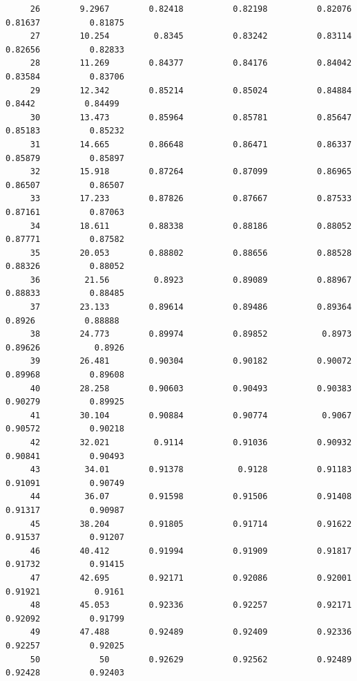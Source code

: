 \documentclass[
]{book}
\begin{document}
\begin{verbatim}
     26        9.2967        0.82418          0.82198          0.82076          0.81637          0.81875   
     27        10.254         0.8345          0.83242          0.83114          0.82656          0.82833   
     28        11.269        0.84377          0.84176          0.84042          0.83584          0.83706   
     29        12.342        0.85214          0.85024          0.84884           0.8442          0.84499   
     30        13.473        0.85964          0.85781          0.85647          0.85183          0.85232   
     31        14.665        0.86648          0.86471          0.86337          0.85879          0.85897   
     32        15.918        0.87264          0.87099          0.86965          0.86507          0.86507   
     33        17.233        0.87826          0.87667          0.87533          0.87161          0.87063   
     34        18.611        0.88338          0.88186          0.88052          0.87771          0.87582   
     35        20.053        0.88802          0.88656          0.88528          0.88326          0.88052   
     36         21.56         0.8923          0.89089          0.88967          0.88833          0.88485   
     37        23.133        0.89614          0.89486          0.89364           0.8926          0.88888   
     38        24.773        0.89974          0.89852           0.8973          0.89626           0.8926   
     39        26.481        0.90304          0.90182          0.90072          0.89968          0.89608   
     40        28.258        0.90603          0.90493          0.90383          0.90279          0.89925   
     41        30.104        0.90884          0.90774           0.9067          0.90572          0.90218   
     42        32.021         0.9114          0.91036          0.90932          0.90841          0.90493   
     43         34.01        0.91378           0.9128          0.91183          0.91091          0.90749   
     44         36.07        0.91598          0.91506          0.91408          0.91317          0.90987   
     45        38.204        0.91805          0.91714          0.91622          0.91537          0.91207   
     46        40.412        0.91994          0.91909          0.91817          0.91732          0.91415   
     47        42.695        0.92171          0.92086          0.92001          0.91921           0.9161   
     48        45.053        0.92336          0.92257          0.92171          0.92092          0.91799   
     49        47.488        0.92489          0.92409          0.92336          0.92257          0.92025   
     50            50        0.92629          0.92562          0.92489          0.92428          0.92403   
\end{verbatim}
\end{document}
